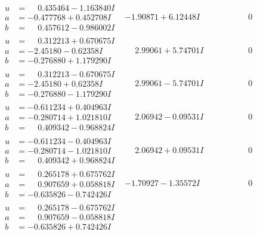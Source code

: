 \documentclass[1p]{elsarticle_modified}
\theoremstyle{definition}
\begin{document}
$$\begin{array}{c|c|c}
\begin{aligned}
u &= \phantom{-}0.435464 - 1.163840 I \\
a &= -0.477768 + 0.452708 I \\
b &= \phantom{-}0.457612 - 0.986002 I\end{aligned}
 & -1.90871 + 6.12448 I & \phantom{-0.000000 } 0 \\ \hline\begin{aligned}
u &= \phantom{-}0.312213 + 0.670675 I \\
a &= -2.45180 - 0.62358 I \\
b &= -0.276880 + 1.179290 I\end{aligned}
 & \phantom{-}2.99061 + 5.74701 I & \phantom{-0.000000 } 0 \\ \hline\begin{aligned}
u &= \phantom{-}0.312213 - 0.670675 I \\
a &= -2.45180 + 0.62358 I \\
b &= -0.276880 - 1.179290 I\end{aligned}
 & \phantom{-}2.99061 - 5.74701 I & \phantom{-0.000000 } 0 \\ \hline\begin{aligned}
u &= -0.611234 + 0.404963 I \\
a &= -0.280714 + 1.021810 I \\
b &= \phantom{-}0.409342 - 0.968824 I\end{aligned}
 & \phantom{-}2.06942 - 0.09531 I & \phantom{-0.000000 } 0 \\ \hline\begin{aligned}
u &= -0.611234 - 0.404963 I \\
a &= -0.280714 - 1.021810 I \\
b &= \phantom{-}0.409342 + 0.968824 I\end{aligned}
 & \phantom{-}2.06942 + 0.09531 I & \phantom{-0.000000 } 0 \\ \hline\begin{aligned}
u &= \phantom{-}0.265178 + 0.675762 I \\
a &= \phantom{-}0.907659 + 0.058818 I \\
b &= -0.635826 - 0.742426 I\end{aligned}
 & -1.70927 - 1.35572 I & \phantom{-0.000000 } 0 \\ \hline\begin{aligned}
u &= \phantom{-}0.265178 - 0.675762 I \\
a &= \phantom{-}0.907659 - 0.058818 I \\
b &= -0.635826 + 0.742426 I\end{aligned}

\end{array}$$
\end{document}
